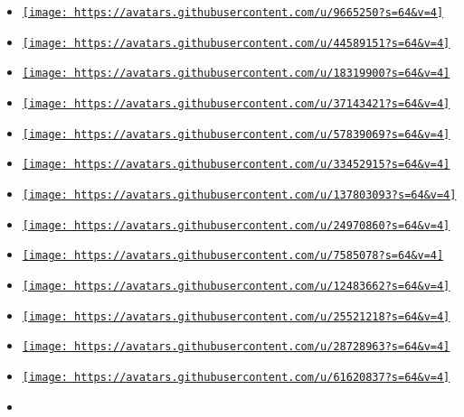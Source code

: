\begin{itemize}
\tightlist
\item
  \href{https://github.com/Dherse}{\texttt{[image: https://avatars.githubusercontent.com/u/9665250?s=64\&v=4]}}
\item
  \href{https://github.com/frozolotl}{\texttt{[image: https://avatars.githubusercontent.com/u/44589151?s=64\&v=4]}}
\item
  \href{https://github.com/Leedehai}{\texttt{[image: https://avatars.githubusercontent.com/u/18319900?s=64\&v=4]}}
\item
  \href{https://github.com/Andrew15-5}{\texttt{[image: https://avatars.githubusercontent.com/u/37143421?s=64\&v=4]}}
\item
  \href{https://github.com/MDLC01}{\texttt{[image: https://avatars.githubusercontent.com/u/57839069?s=64\&v=4]}}
\item
  \href{https://github.com/danieleades}{\texttt{[image: https://avatars.githubusercontent.com/u/33452915?s=64\&v=4]}}
\item
  \href{https://github.com/tingerrr}{\texttt{[image: https://avatars.githubusercontent.com/u/137803093?s=64\&v=4]}}
\item
  \href{https://github.com/Jollywatt}{\texttt{[image: https://avatars.githubusercontent.com/u/24970860?s=64\&v=4]}}
\item
  \href{https://github.com/cmoog}{\texttt{[image: https://avatars.githubusercontent.com/u/7585078?s=64\&v=4]}}
\item
  \href{https://github.com/peng1999}{\texttt{[image: https://avatars.githubusercontent.com/u/12483662?s=64\&v=4]}}
\item
  \href{https://github.com/Enter-tainer}{\texttt{[image: https://avatars.githubusercontent.com/u/25521218?s=64\&v=4]}}
\item
  \href{https://github.com/JakobSachs}{\texttt{[image: https://avatars.githubusercontent.com/u/28728963?s=64\&v=4]}}
\item
  \href{https://github.com/KronosTheLate}{\texttt{[image: https://avatars.githubusercontent.com/u/61620837?s=64\&v=4]}}
\item

\end{itemize}
